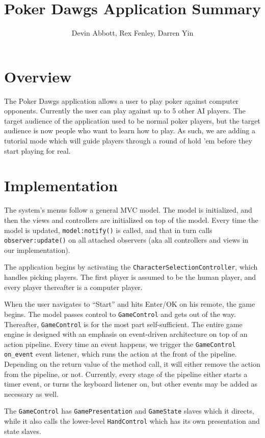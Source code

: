 \documentclass[10pt]{article}
\title{Poker Dawgs Application Summary}
\author{Devin Abbott, Rex Fenley, Darren Yin}
\begin{document}
\maketitle
\section*{Overview}
The Poker Dawgs application allows a user to play poker against
computer opponents. Currently the user can play against up to 5 other
AI players. The target audience of the application used to be normal
poker players, but the target audience is now people who want to learn
how to play. As such, we are adding a tutorial mode which will guide
players through a round of hold 'em before they start playing for
real.

\section*{Implementation}
The system's menus follow a general MVC model. The model is
initialized, and then the views and controllers are initialized on top
of the model. Every time the model is updated, \verb^model:notify()^
is called, and that in turn calls \verb^observer:update()^ on all
attached observers (aka all controllers and views in our
implementation).

The application begins by activating the
\verb^CharacterSelectionController^, which handles picking
players. The first player is assumed to be the human player, and every
player thereafter is a computer player.

When the user navigates to ``Start'' and hits Enter/OK on his remote,
the game begins. The model passes control to \verb^GameControl^ and
gets out of the way. Thereafter, \verb^GameControl^ is for the most
part self-sufficient. The entire game engine is designed with an
emphasis on event-driven architecture on top of an action
pipeline. Every time an event happens, we trigger the
\verb^GameControl^ \verb^on_event^ event listener, which runs the
action at the front of the pipeline. Depending on the return value of
the method call, it will either remove the action from the pipeline,
or not. Currently, every stage of the pipeline either starts a timer
event, or turns the keyboard listener on, but other events may be
added as necessary as well.

The \verb^GameControl^ has \verb^GamePresentation^ and
\verb^GameState^ slaves which it directs, while it also calls the
lower-level \verb^HandControl^ which has its own presentation and
state slaves.
\end{document}
